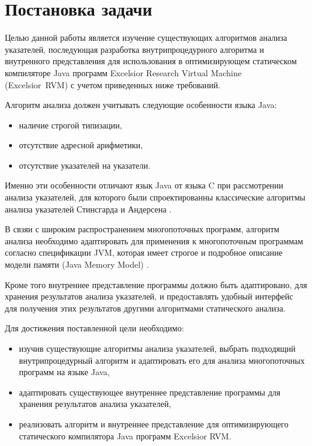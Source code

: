 \documentclass[14pt,titlepage]{extarticle}
\newcommand{\eng}[1]{{\English#1}}
\begin{document}
  \section{Постановка задачи}

    Целью данной работы является изучение существующих алгоритмов анализа
    указателей, последующая разработка внутрипроцедурного алгоритма и
    внутренного представления для использования в оптимизирующем
    статическом компиляторе Java программ
    \eng{Excelsior Research Virtual Machine (Excelsior~RVM)}
    с учетом приведенных ниже требований.

    Алгоритм анализа должен учитывать следующие особенности языка Java:
    \begin{itemize}
      \item наличие строгой типизации,
      \item отсутствие адресной арифметики,
      \item отсутствие указателей на указатели.
    \end{itemize}
    Именно эти особенности отличают язык Java от языка C при рассмотрении
    анализа указателей, для которого были
    спроектированны классические алгоритмы анализа указателей
    Стинсгарда \cite{steensgaard} и Андерсена \cite{andersen}.

    В свзяи с широким распространением многопоточных программ,
    алгоритм анализа необходимо адаптировать для применения к
    многопоточным программам согласно спецификации JVM, которая имеет
    строгое и подробное описание модели памяти (Java Memory Model)
    \cite{manson_jmm}.

    Кроме того внутреннее представление программы должно быть адаптировано,
    для хранения результатов анализа указателей, и предоставлять удобный
    интерфейс для получения этих результатов другими алгоритмами статического
    анализа.

    Для достижения поставленной цели необходимо:
    \begin{itemize}
      \item изучив существующие алгоритмы анализа указателей, выбрать
            подходящий внутрипроцедурный алгоритм и адаптировать его
            для анализа многопоточных программ на языке Java,
      \item адаптировать существующее внутреннее представление программы для
            хранения результатов анализа указателей,
      \item реализовать алгоритм и внутреннее представление для оптимизирующего
            статического компилятора Java программ \eng{Excelsior RVM}.
    \end{itemize}
\end{document}
